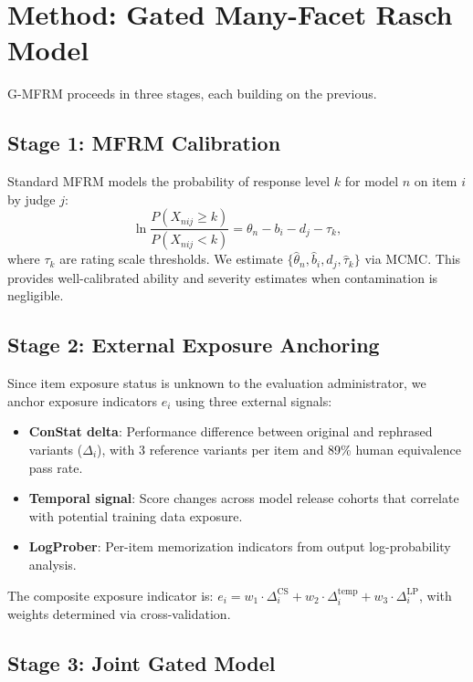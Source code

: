 \documentclass[11pt]{article}
\begin{document}
\section{Method: Gated Many-Facet Rasch Model}
\label{sec:method}

G-MFRM proceeds in three stages, each building on the previous.

\subsection{Stage 1: MFRM Calibration}

Standard MFRM models the probability of response level $k$ for model $n$ on item $i$ by judge $j$:
\begin{equation}
    \ln\frac{P(X_{nij} \geq k)}{P(X_{nij} < k)} = \theta_n - b_i - d_j - \tau_k,
    \label{eq:mfrm}
\end{equation}
where $\tau_k$ are rating scale thresholds. We estimate $\{\hat{\theta}_n, \hat{b}_i, \hat{d}_j, \hat{\tau}_k\}$ via MCMC. This provides well-calibrated ability and severity estimates when contamination is negligible.

\subsection{Stage 2: External Exposure Anchoring}

Since item exposure status is unknown to the evaluation administrator, we anchor exposure indicators $e_i$ using three external signals:

\begin{itemize}
    \item \textbf{ConStat delta}: Performance difference between original and rephrased variants ($\Delta_i$), with 3 reference variants per item and 89\% human equivalence pass rate.
    \item \textbf{Temporal signal}: Score changes across model release cohorts that correlate with potential training data exposure.
    \item \textbf{LogProber}: Per-item memorization indicators from output log-probability analysis.
\end{itemize}

The composite exposure indicator is: $e_i = w_1 \cdot \Delta_i^{\text{CS}} + w_2 \cdot \Delta_i^{\text{temp}} + w_3 \cdot \Delta_i^{\text{LP}}$, with weights determined via cross-validation.

\subsection{Stage 3: Joint Gated Model}
\end{document}
